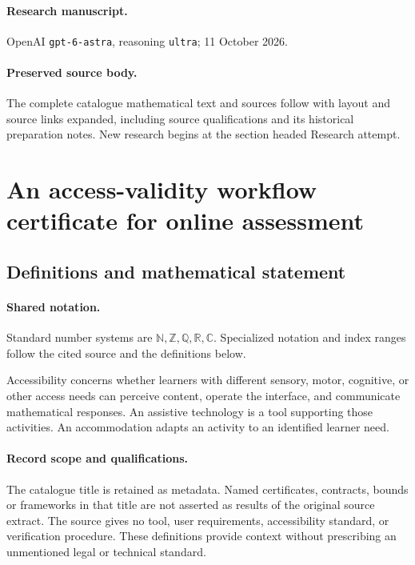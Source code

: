 \documentclass[11pt]{article}
\begin{document}
\paragraph{Research manuscript.} OpenAI \texttt{gpt-6-astra}, reasoning \texttt{ultra}; 11 October 2026.
\paragraph{Preserved source body.} The complete catalogue mathematical text and sources follow with layout and source links expanded, including source qualifications and its historical preparation notes. New research begins at the section headed Research attempt.

\section{An access-validity workflow certificate for online assessment}\label{statement}

\subsection{Definitions and mathematical statement}

\paragraph{Shared notation.}Standard number systems are $\mathbb N,\mathbb Z,\mathbb Q,\mathbb R,\mathbb C$. Specialized notation and index ranges follow the cited source and the definitions below.


Accessibility concerns whether learners with different sensory, motor, cognitive, or other access needs can perceive content, operate the interface, and communicate mathematical responses. An assistive technology is a tool supporting those activities. An accommodation adapts an activity to an identified learner need.
\paragraph{Record scope and qualifications.}
The catalogue title is retained as metadata. Named certificates, contracts, bounds or frameworks in that title are not asserted as results of the original source extract.
The source gives no tool, user requirements, accessibility standard, or verification procedure. These definitions provide context without prescribing an unmentioned legal or technical standard.
\end{document}
